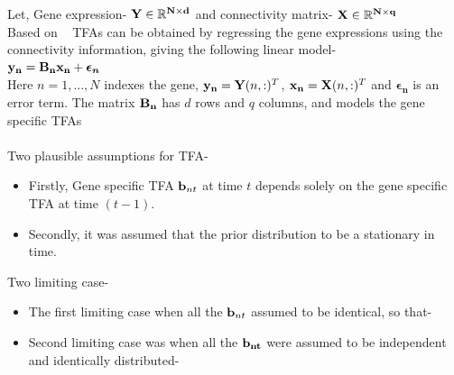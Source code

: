 \documentclass[12pt]{article}
\begin{document}
Let, Gene expression- $ \bold{Y} \in \mathbb{R} ^ { \bold{N} \times \bold{d} } $  and connectivity matrix- $ \bold{X} \in \mathbb{R} ^ { \bold{N} \times \bold{q} } $ \\

Based on ~\cite{sanguinetti:01} TFAs can be obtained by regressing the gene expressions using the connectivity information, giving the following linear model- \\
	 { \centering   $ \bold{y_{n}} = \bold{B_{n}} \bold{x_{n}} + \boldsymbol{\epsilon_{n}}$ } \\

Here $n = 1, . . . ,N$ indexes the gene, $ \bold{y_{n}} = \bold{Y}(n,:)^T $, $ \bold{x_{n}} = \bold{X}(n,:)^T $ and  $ \boldsymbol{\epsilon_{n}} $ is an error term. The matrix $ \bold{B_{n}} $ has $ d $ rows and $ q $ columns, and models the gene specific TFAs \\~\\
      
Two plausible assumptions for TFA-
\begin{itemize}
\item Firstly, Gene specific TFA $ \bold{b}_{nt} $ at time $ t $ depends solely on the gene specific TFA at time $ (t-1) $. 
\item Secondly, it was assumed that the prior distribution to be a stationary in time. 
\end {itemize}
      
Two limiting case-
\begin{itemize}
\item The first limiting case when all the $ \bold{b}_{nt} $ assumed to be identical, so that- \\
\raggedright
\item Second limiting case was when all the $ \bold{ b_{nt}} $ were assumed to be independent and identically distributed- \\ 

\end{itemize}
      
\end{document}
